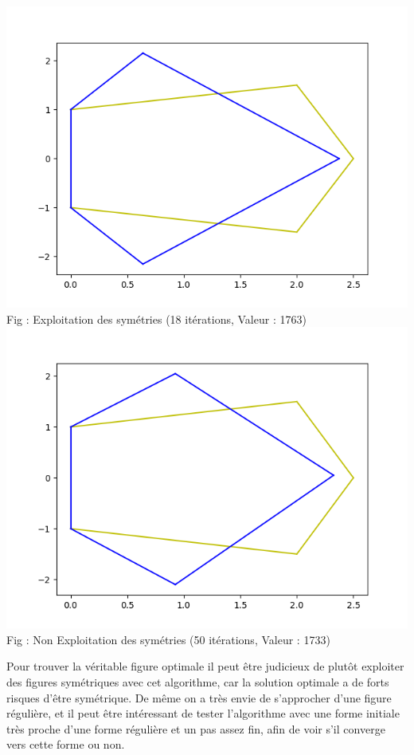 \documentclass[a4paper,reqno]{article}
\begin{document}
\begin{center}
	\includegraphics[scale=0.45]{symetrieAlgo.png}\\
	Fig : Exploitation des symétries (18 itérations, Valeur : 1763)\\
	\includegraphics[scale=0.45]{comp3.png}\\
	Fig : Non Exploitation des symétries (50 itérations, Valeur : 1733)

\end{center}

\par Pour trouver la véritable figure optimale il peut être judicieux de plutôt exploiter des figures symétriques avec cet algorithme, car la solution optimale a de forts risques d'être symétrique. De même on a très envie de s'approcher d'une figure régulière, et il peut être intéressant de tester l'algorithme avec une forme initiale très proche d'une forme régulière et un pas assez fin, afin de voir s'il converge vers cette forme ou non. \\ 
\end{document}
